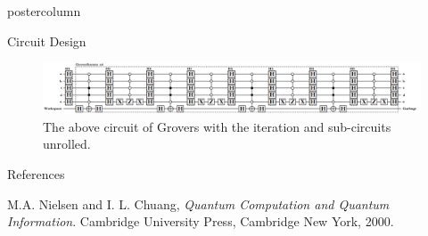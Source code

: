 \documentclass[final]{beamer} %
\begin{document}
\begin{frame}{}
\begin{columns}
\begin{column}{.33\textwidth}
\begin{beamercolorbox}[center,wd=\textwidth]{postercolumn}
\begin{minipage}[T]{.95\textwidth}
\begin{block}{\large Circuit Design}
\begin{figure}[!htbp]
		            \centering
		            \includegraphics[width=14in]{figures/Grover_Unroll.png}
		            \caption{The above circuit of Grovers with the iteration and sub-circuits unrolled.}
		        \end{figure}
            \end{block}
            \begin{block}{\large References}
		    \begin{thebibliography}{9}
                \small{
  		            M.A. Nielsen and I. L. Chuang, 
  		            \emph{Quantum Computation and Quantum Information}.
  		            Cambridge University Press,
		            Cambridge New York,
  		            2000.
                }
		    \end{thebibliography}
            \end{block}
        \end{minipage}
        \end{beamercolorbox}
        \end{column}


\end{columns}
\end{frame}
\end{document}
